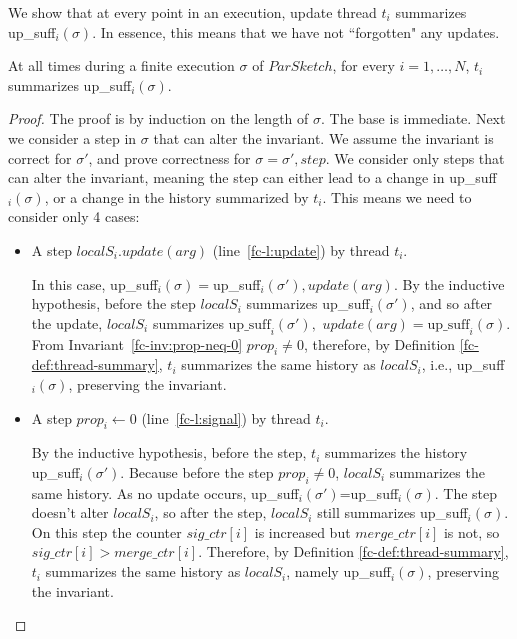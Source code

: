 We show that at every point in an execution, update thread $t_i$ summarizes up\_suff$_i(\sigma)$. 
In essence, this means that we have not ``forgotten" any updates.
\begin{invariant}
    At all times during a finite execution $\sigma$ of $ParSketch$, for every $i=1,\dots,N$, $t_i$ summarizes up\_suff$_i(\sigma)$.
    \label{fc-inv:update-thread-summary}
\end{invariant}
\begin{proof}
    The proof is by induction on the length of $\sigma$. The base is immediate.
    Next we consider a step in $\sigma$ that can alter the invariant. We assume the invariant is correct
    for $\sigma'$, and prove correctness for $\sigma=\sigma',step$. We consider only steps that
    can alter the invariant, meaning the step can 
    either lead to a change in up\_suff$_i(\sigma)$, or a change in the history summarized by $t_i$. This
    means we need to consider only 4 cases:
    \begin{itemize}

        \item A step $localS_i.update(arg)$ (line~\ref{fc-l:update}) by thread $t_i$.

        In this case, up\_suff$_i(\sigma)=$up\_suff$_i(\sigma'),update(arg)$.
        By the inductive hypothesis, before the step $localS_i$ summarizes up\_suff$_i(\sigma')$,
        and so after the update, $localS_i$ summarizes $\text{up\_suff}_i(\sigma'),$ \linebreak $update(arg)=\text{up\_suff}_i(\sigma)$.
        From Invariant~\ref{fc-inv:prop-neq-0} $prop_i \neq 0$, therefore, by Definition \ref{fc-def:thread-summary}, $t_i$ summarizes
        the same history as $localS_i$,
        i.e., up\_suff$_i(\sigma)$, preserving the invariant.

        \item A step $prop_i \leftarrow 0$ (line~\ref{fc-l:signal}) by thread $t_i$.
        
        By the inductive hypothesis, before the step, $t_i$ summarizes the 
        history up\_suff$_i(\sigma')$. Because before the step  $prop_i \ne 0$, $localS_i$ 
				summarizes the same history.
        As no update occurs, up\_suff$_i(\sigma')$=up\_suff$_i(\sigma)$. The step
        doesn't alter $localS_i$, so after the step, $localS_i$ still summarizes
        up\_suff$_i(\sigma)$. On this step the counter $sig\_ctr[i]$ is increased but $merge\_ctr[i]$
        is not, so $sig\_ctr[i]>merge\_ctr[i]$.
        Therefore, by Definition \ref{fc-def:thread-summary}, $t_i$ summarizes the same history as $localS_i$,
        namely up\_suff$_i(\sigma)$, preserving the invariant.


\end{itemize}
\end{proof}
